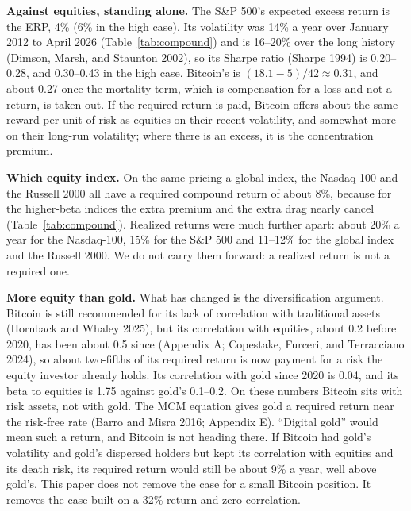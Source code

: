 \documentclass[11pt]{article}
\begin{document}
\textbf{Against equities, standing alone.} The S\&P 500's expected excess return is the ERP, 4\% (6\% in the high case). Its volatility was 14\% a year over January 2012 to April 2026 (Table~\ref{tab:compound}) and is 16--20\% over the long history (Dimson, Marsh, and Staunton 2002), so its Sharpe ratio (Sharpe 1994) is 0.20--0.28, and 0.30--0.43 in the high case. Bitcoin's is $(18.1-5)/42 \approx 0.31$, and about 0.27 once the mortality term, which is compensation for a loss and not a return, is taken out. If the required return is paid, Bitcoin offers about the same reward per unit of risk as equities on their recent volatility, and somewhat more on their long-run volatility; where there is an excess, it is the concentration premium.

\textbf{Which equity index.} On the same pricing a global index, the Nasdaq-100 and the Russell 2000 all have a required compound return of about 8\%, because for the higher-beta indices the extra premium and the extra drag nearly cancel (Table~\ref{tab:compound}). Realized returns were much further apart: about 20\% a year for the Nasdaq-100, 15\% for the S\&P 500 and 11--12\% for the global index and the Russell 2000. We do not carry them forward: a realized return is not a required one.

\textbf{More equity than gold.} What has changed is the diversification argument. Bitcoin is still recommended for its lack of correlation with traditional assets (Hornback and Whaley 2025), but its correlation with equities, about 0.2 before 2020, has been about 0.5 since (Appendix A; Copestake, Furceri, and Terracciano 2024), so about two-fifths of its required return is now payment for a risk the equity investor already holds. Its correlation with gold since 2020 is 0.04, and its beta to equities is 1.75 against gold's 0.1--0.2. On these numbers Bitcoin sits with risk assets, not with gold. The MCM equation gives gold a required return near the risk-free rate (Barro and Misra 2016; Appendix E). ``Digital gold'' would mean such a return, and Bitcoin is not heading there. If Bitcoin had gold's volatility and gold's dispersed holders but kept its correlation with equities and its death risk, its required return would still be about 9\% a year, well above gold's. This paper does not remove the case for a small Bitcoin position. It removes the case built on a 32\% return and zero correlation.
\end{document}
